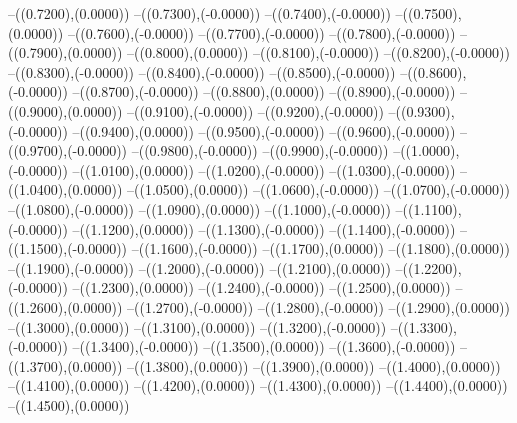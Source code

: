 {	--({\sx*(0.7200)},{\sy*(0.0000)})
	--({\sx*(0.7300)},{\sy*(-0.0000)})
	--({\sx*(0.7400)},{\sy*(-0.0000)})
	--({\sx*(0.7500)},{\sy*(0.0000)})
	--({\sx*(0.7600)},{\sy*(-0.0000)})
	--({\sx*(0.7700)},{\sy*(-0.0000)})
	--({\sx*(0.7800)},{\sy*(-0.0000)})
	--({\sx*(0.7900)},{\sy*(0.0000)})
	--({\sx*(0.8000)},{\sy*(0.0000)})
	--({\sx*(0.8100)},{\sy*(-0.0000)})
	--({\sx*(0.8200)},{\sy*(-0.0000)})
	--({\sx*(0.8300)},{\sy*(-0.0000)})
	--({\sx*(0.8400)},{\sy*(-0.0000)})
	--({\sx*(0.8500)},{\sy*(-0.0000)})
	--({\sx*(0.8600)},{\sy*(-0.0000)})
	--({\sx*(0.8700)},{\sy*(-0.0000)})
	--({\sx*(0.8800)},{\sy*(0.0000)})
	--({\sx*(0.8900)},{\sy*(-0.0000)})
	--({\sx*(0.9000)},{\sy*(0.0000)})
	--({\sx*(0.9100)},{\sy*(-0.0000)})
	--({\sx*(0.9200)},{\sy*(-0.0000)})
	--({\sx*(0.9300)},{\sy*(-0.0000)})
	--({\sx*(0.9400)},{\sy*(0.0000)})
	--({\sx*(0.9500)},{\sy*(-0.0000)})
	--({\sx*(0.9600)},{\sy*(-0.0000)})
	--({\sx*(0.9700)},{\sy*(-0.0000)})
	--({\sx*(0.9800)},{\sy*(-0.0000)})
	--({\sx*(0.9900)},{\sy*(-0.0000)})
	--({\sx*(1.0000)},{\sy*(-0.0000)})
	--({\sx*(1.0100)},{\sy*(0.0000)})
	--({\sx*(1.0200)},{\sy*(-0.0000)})
	--({\sx*(1.0300)},{\sy*(-0.0000)})
	--({\sx*(1.0400)},{\sy*(0.0000)})
	--({\sx*(1.0500)},{\sy*(0.0000)})
	--({\sx*(1.0600)},{\sy*(-0.0000)})
	--({\sx*(1.0700)},{\sy*(-0.0000)})
	--({\sx*(1.0800)},{\sy*(-0.0000)})
	--({\sx*(1.0900)},{\sy*(0.0000)})
	--({\sx*(1.1000)},{\sy*(-0.0000)})
	--({\sx*(1.1100)},{\sy*(-0.0000)})
	--({\sx*(1.1200)},{\sy*(0.0000)})
	--({\sx*(1.1300)},{\sy*(-0.0000)})
	--({\sx*(1.1400)},{\sy*(-0.0000)})
	--({\sx*(1.1500)},{\sy*(-0.0000)})
	--({\sx*(1.1600)},{\sy*(-0.0000)})
	--({\sx*(1.1700)},{\sy*(0.0000)})
	--({\sx*(1.1800)},{\sy*(0.0000)})
	--({\sx*(1.1900)},{\sy*(-0.0000)})
	--({\sx*(1.2000)},{\sy*(-0.0000)})
	--({\sx*(1.2100)},{\sy*(0.0000)})
	--({\sx*(1.2200)},{\sy*(-0.0000)})
	--({\sx*(1.2300)},{\sy*(0.0000)})
	--({\sx*(1.2400)},{\sy*(-0.0000)})
	--({\sx*(1.2500)},{\sy*(0.0000)})
	--({\sx*(1.2600)},{\sy*(0.0000)})
	--({\sx*(1.2700)},{\sy*(-0.0000)})
	--({\sx*(1.2800)},{\sy*(-0.0000)})
	--({\sx*(1.2900)},{\sy*(0.0000)})
	--({\sx*(1.3000)},{\sy*(0.0000)})
	--({\sx*(1.3100)},{\sy*(0.0000)})
	--({\sx*(1.3200)},{\sy*(-0.0000)})
	--({\sx*(1.3300)},{\sy*(-0.0000)})
	--({\sx*(1.3400)},{\sy*(-0.0000)})
	--({\sx*(1.3500)},{\sy*(0.0000)})
	--({\sx*(1.3600)},{\sy*(-0.0000)})
	--({\sx*(1.3700)},{\sy*(0.0000)})
	--({\sx*(1.3800)},{\sy*(0.0000)})
	--({\sx*(1.3900)},{\sy*(0.0000)})
	--({\sx*(1.4000)},{\sy*(0.0000)})
	--({\sx*(1.4100)},{\sy*(0.0000)})
	--({\sx*(1.4200)},{\sy*(0.0000)})
	--({\sx*(1.4300)},{\sy*(0.0000)})
	--({\sx*(1.4400)},{\sy*(0.0000)})
	--({\sx*(1.4500)},{\sy*(0.0000)})
}
